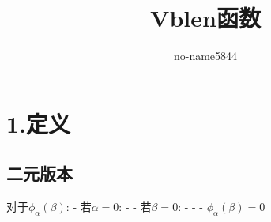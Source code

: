 \documentclass[UTF8]{ctexart}
\title{Vblen函数}
\author{no-name5844}
\begin{document}
\maketitle

\section{1.定义}
\subsection*{二元版本}
对于$\phi_\alpha(\beta)$:
- 若$\alpha=0$:
- - 若$\beta=0$:
- - - $\phi_\alpha(\beta)=0$
\end{document}
